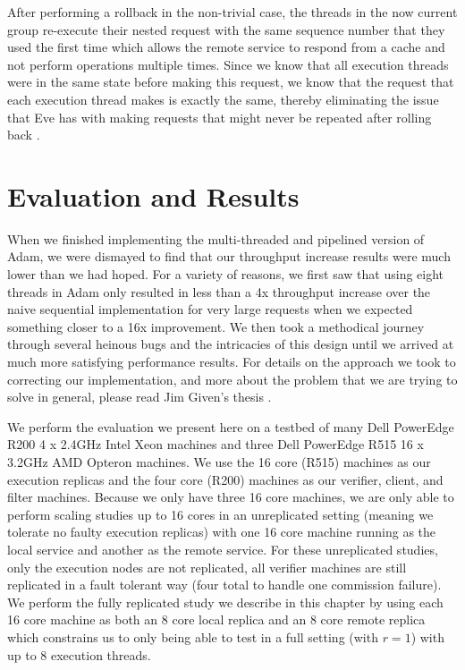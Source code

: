 \documentclass[11pt, oneside]{report}
\begin{document}
After performing a rollback in the non-trivial case, the threads in the now current group re-execute their nested request with the same sequence number that they used the first time which allows the remote service to respond from a cache and not perform operations multiple times.
Since we know that all execution threads were in the same state before making this request, we know that the request that each execution thread makes is exactly the same, thereby eliminating the issue that Eve has with making requests that might never be repeated after rolling back \cite{manosThesis}.

\chapter{Evaluation and Results}\label{AdamResults}

When we finished implementing the multi-threaded and pipelined version of Adam, we were dismayed to find that our throughput increase results were much lower than we had hoped. 
For a variety of reasons, we first saw that using eight threads in Adam only resulted in less than a 4x throughput increase over the naive sequential implementation for very large requests when we expected something closer to a 16x improvement. 
We then took a methodical journey through several heinous bugs and the intricacies of this design until we arrived at much more satisfying performance results. 
For details on the approach we took to correcting our implementation, and more about the problem that we are trying to solve in general, please read Jim Given's thesis \cite{jim}.

We perform the evaluation we present here on a testbed of many Dell PowerEdge R200 4 x 2.4GHz Intel Xeon machines and three Dell PowerEdge R515 16 x 3.2GHz AMD Opteron machines. 
We use the 16 core (R515) machines as our execution replicas and the four core (R200) machines as our verifier, client, and filter machines. 
Because we only have three 16 core machines, we are only able to perform scaling studies up to 16 cores in an unreplicated setting (meaning we tolerate no faulty execution replicas) with one 16 core machine running as the local service and another as the remote service. 
For these unreplicated studies, only the execution nodes are not replicated, all verifier machines are still replicated in a fault tolerant way (four total to handle one commission failure). 
We perform the fully replicated study we describe in this chapter by using each 16 core machine as both an 8 core local replica and an 8 core remote replica which constrains us to only being able to test in a full setting (with $r = 1$) with up to 8 execution threads.
\end{document}
